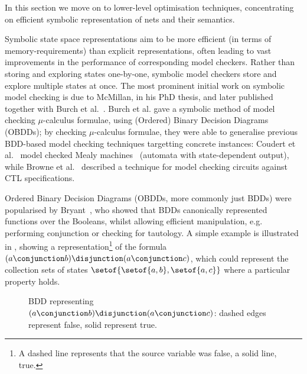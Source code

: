 \label{sec:decision-diagrams}

In this section we move on to lower-level optimisation techniques,
concentrating on efficient symbolic representation of nets and their semantics.

Symbolic state space representations aim to be more efficient (in terms of
memory-requirements) than explicit representations, often leading to vast
improvements in the performance of corresponding model checkers. Rather than
storing and exploring states one-by-one, symbolic model checkers store and
explore multiple states at once. The most prominent initial work on symbolic
model checking is due to McMillan, in his PhD thesis, and later published
together with {Burch et al.}~\cite{Burch1992}. {Burch et al.} gave a symbolic
method of model checking $\mu$-calculus formulae, using (Ordered) Binary
Decision Diagrams (OBDDs); by checking $\mu$-calculus formulae, they were able
to generalise previous BDD-based model checking techniques targetting concrete
instances: {Coudert et al.}~\cite{Coudert1990} model checked Mealy
machines~\cite{Mealy1955} (automata with state-dependent output), while {Browne
et al.}~\cite{Dill1986} described a technique for model checking circuits
against CTL specifications.

Ordered Binary Decision Diagrams (OBDDs, more commonly just BDDs) were
popularised by Bryant~\cite{Bryant1986}, who showed that BDDs canonically
represented functions over the Booleans, whilst allowing efficient
manipulation, e.g. performing conjunction or checking for tautology. A simple
example is illustrated in , showing a
representation\footnote{A dashed line represents that the source variable was
false, a solid line, true.} of the formula $(a \conjunction b) \disjunction (a
\conjunction c)$, which could represent the collection sets of states
$\setof{\setof{a,b}, \setof{a,c}}$ where a particular property holds.

\begin{figure}[ht]
    \centering
    \newcommand{\capt}{BDD representing $(a \conjunction b) \disjunction (a
    \conjunction c)$}
    \caption[\capt]{\capt: dashed edges represent false, solid represent true.}
    \label{fig:simpleBDD}
\end{figure}

